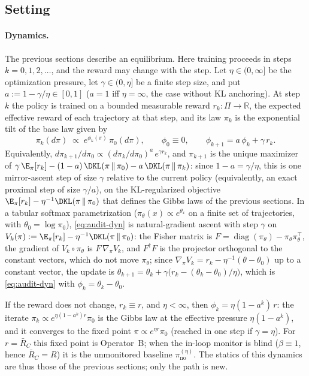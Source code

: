 \subsection{Setting}

\paragraph{Dynamics.} The previous sections describe an equilibrium. Here
training proceeds in steps $k=0,1,2,\dots$, and the reward may change with the
step. Let $\eta\in(0,\infty]$ be the optimization pressure, let
$\gamma\in(0,\eta]$ be a finite step size, and put
$a:=1-\gamma/\eta\in[0,1]$ ($a=1$ iff $\eta=\infty$, the case without KL
anchoring). At step $k$ the policy is trained on a bounded measurable reward
$r_k:\Pi\to\mathbb R$, the expected effective reward of each trajectory at
that step, and its law $\pi_k$ is the exponential tilt of the base law given
by
\begin{equation}\label{eq:audit-dyn}
  \pi_k(d\pi)\;\propto\;e^{\phi_k(\pi)}\,\pi_0(d\pi),\qquad
  \phi_0\equiv0,\qquad \phi_{k+1}=a\,\phi_k+\gamma\,r_k .
\end{equation}
Equivalently, $d\pi_{k+1}/d\pi_0\propto(d\pi_k/d\pi_0)^{a}\,e^{\gamma r_k}$,
and $\pi_{k+1}$ is the unique maximizer of
$\gamma\,\E_{\pi}[r_k]-(1-a)\,\DKL(\pi\,\|\,\pi_0)-a\,\DKL(\pi\,\|\,\pi_k)$:
since $1-a=\gamma/\eta$, this is one mirror-ascent step of size $\gamma$ relative
to the current policy (equivalently, an exact proximal step of size $\gamma/a$), on the KL-regularized objective
$\E_{\pi}[r_k]-\eta^{-1}\DKL(\pi\,\|\,\pi_0)$ that defines the Gibbs laws of
the previous sections. In a tabular softmax parametrization
($\pi_\theta(x)\propto e^{\theta_x}$ on a finite set of trajectories, with
$\theta_0=\log\pi_0$), \eqref{eq:audit-dyn} is natural-gradient ascent with
step $\gamma$ on $V_k(\pi):=\E_{\pi}[r_k]-\eta^{-1}\DKL(\pi\,\|\,\pi_0)$: the
Fisher matrix is
$F=\operatorname{diag}(\pi_\theta)-\pi_\theta\pi_\theta^{\top}$, the gradient
of $V_k\circ\pi_\theta$ is $F\,\nabla_\pi V_k$, and $F^{\dagger}F$ is the
projector orthogonal to the constant vectors, which do not move $\pi_\theta$;
since $\nabla_\pi V_k=r_k-\eta^{-1}(\theta-\theta_0)$ up to a constant vector,
the update is
$\theta_{k+1}=\theta_k+\gamma\bigl(r_k-(\theta_k-\theta_0)/\eta\bigr)$, which
is \eqref{eq:audit-dyn} with $\phi_k=\theta_k-\theta_0$.

If the reward does not change, $r_k\equiv r$, and $\eta<\infty$, then
$\phi_k=\eta(1-a^k)\,r$: the iterate $\pi_k\propto e^{\eta(1-a^k)r}\pi_0$ is
the Gibbs law at the effective pressure $\eta(1-a^k)$, and it converges to the
fixed point $\pi\propto e^{\eta r}\pi_0$ (reached in one step if
$\gamma=\eta$). For $r=\bar R_C$ this fixed point is Operator~B; when the
in-loop monitor is blind ($\beta\equiv1$, hence $\bar R_C=R$) it is the
unmonitored baseline $\pi_{\mathrm{no}}^{(\eta)}$. The statics of this
dynamics are thus those of the previous sections; only the path is new.

